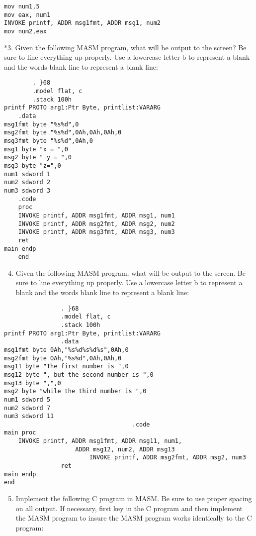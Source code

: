 \documentclass[10pt]{article}
\begin{document}
\begin{verbatim}
mov num1,5
mov eax, num1
INVOKE printf, ADDR msg1fmt, ADDR msg1, num2
mov num2,eax
\end{verbatim}

*3. Given the following MASM program, what will be output to the screen? Be sure to line everything up properly. Use a lowercase letter b to represent a blank and the words blank line to represent a blank line:

\begin{verbatim}
        . }68
        .model flat, c
        .stack 100h
printf PROTO arg1:Ptr Byte, printlist:VARARG
    .data
msg1fmt byte "%s%d",0
msg2fmt byte "%s%d",0Ah,0Ah,0Ah,0
msg3fmt byte "%s%d",0Ah,0
msg1 byte "x = ",0
msg2 byte " y = ",0
msg3 byte "z=",0
num1 sdword 1
num2 sdword 2
num3 sdword 3
    .code
    proc
    INVOKE printf, ADDR msg1fmt, ADDR msg1, num1
    INVOKE printf, ADDR msg2fmt, ADDR msg2, num2
    INVOKE printf, ADDR msg3fmt, ADDR msg3, num3
    ret
main endp
    end
\end{verbatim}

\begin{enumerate}
  \setcounter{enumi}{3}
  \item Given the following MASM program, what will be output to the screen. Be sure to line everything up properly. Use a lowercase letter b to represent a blank and the words blank line to represent a blank line:
\end{enumerate}

\begin{verbatim}
                . }68
                .model flat, c
                .stack 100h
printf PROTO arg1:Ptr Byte, printlist:VARARG
                .data
msg1fmt byte 0Ah,"%s%d%s%d%s",0Ah,0
msg2fmt byte OAh,"%s%d",0Ah,0Ah,0
msg11 byte "The first number is ",0
msg12 byte ", but the second number is ",0
msg13 byte ",",0
msg2 byte "while the third number is ",0
num1 sdword 5
num2 sdword 7
num3 sdword 11
                                    .code
main proc
    INVOKE printf, ADDR msg1fmt, ADDR msg11, num1,
                    ADDR msg12, num2, ADDR msg13
                        INVOKE printf, ADDR msg2fmt, ADDR msg2, num3
                ret
main endp
end
\end{verbatim}

\begin{enumerate}
  \setcounter{enumi}{4}
  \item Implement the following C program in MASM. Be sure to use proper spacing on all output. If necessary, first key in the C program and then implement the MASM program to insure the MASM program works identically to the C program:
\end{enumerate}
\end{document}
